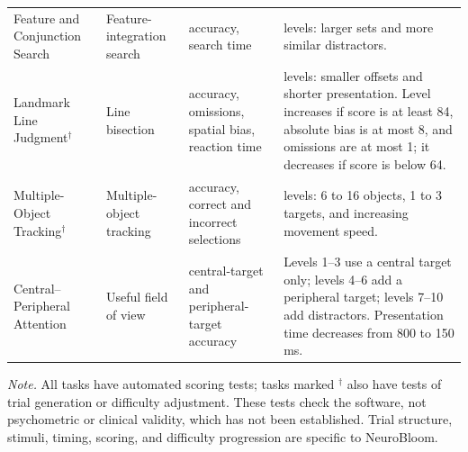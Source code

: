 \documentclass[11pt,a4paper]{article}
\begin{document}
\begin{longtable}{
>{\raggedright\arraybackslash}p{2.9cm}
>{\raggedright\arraybackslash}p{3.2cm}
>{\raggedright\arraybackslash}p{4.2cm}
>{\raggedright\arraybackslash}p{5.5cm}
}
Feature and Conjunction Search
& Feature-integration search~\cite{R25}
& accuracy, search time
& 10 levels: larger sets and more similar distractors. \\

Landmark Line Judgment$^\dagger$
& Line bisection~\cite{R27}
& accuracy, omissions, spatial bias, reaction time
& 10 levels: smaller offsets and shorter presentation. Level increases if score is at least 84, absolute bias is at most 8, and omissions are at most 1; it decreases if score is below 64. \\

Multiple-Object Tracking$^\dagger$
& Multiple-object tracking~\cite{R28}
& accuracy, correct and incorrect selections
& 10 levels: 6 to 16 objects, 1 to 3 targets, and increasing movement speed. \\

Central--Peripheral Attention
& Useful field of view~\cite{R29}
& central-target and peripheral-target accuracy
& Levels 1--3 use a central target only; levels 4--6 add a peripheral target; levels 7--10 add distractors. Presentation time decreases from 800 to 150 ms. \\

\end{longtable}

\noindent\textit{Note.}
All tasks have automated scoring tests; tasks marked $^\dagger$ also have
tests of trial generation or difficulty adjustment. These tests check the
software, not psychometric or clinical validity, which has not been
established. Trial structure, stimuli, timing, scoring, and difficulty
progression are specific to NeuroBloom.



\clearpage

\small
\renewcommand{\arraystretch}{1.25}
\end{document}
